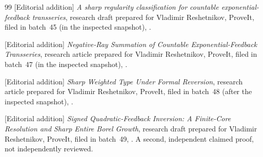 \documentclass[11pt,a4paper]{article}
\numberwithin{equation}{section}
\theoremstyle{definition}
\theoremstyle{remark}
\begin{document}
\begin{thebibliography}{99}
[Editorial addition] \emph{A sharp regularity classification for
countable exponential-feedback transseries}, research draft prepared for
Vladimir Reshetnikov, ProveIt, filed in batch~45 (in the inspected
snapshot),
.

[Editorial addition] \emph{Negative-Ray Summation of Countable
Exponential-Feedback Transseries}, research article prepared for Vladimir
Reshetnikov, ProveIt, filed in batch~47 (in the inspected snapshot),
.

[Editorial addition] \emph{Sharp Weighted Type Under Formal Reversion},
research article prepared for Vladimir Reshetnikov, ProveIt, filed in
batch~48 (after the inspected snapshot),
.

[Editorial addition] \emph{Signed Quadratic-Feedback Inversion: A
Finite-Core Resolution and Sharp Entire Borel Growth}, research draft
prepared for Vladimir Reshetnikov, ProveIt, filed in batch~49,
.
A second, independent claimed proof, not independently reviewed.
\end{thebibliography}
\end{document}
